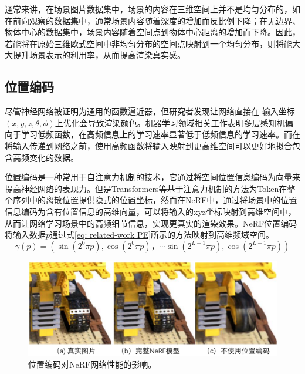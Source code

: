 通常来讲，在场景图片数据集中，场景的内容在三维空间上并不是均匀分布的，如在前向观察的数据集中，通常场景内容随着深度的增加而反比例下降；在无边界、物体中心的数据集中，场景内容随着空间点到物体中心距离的增加而下降。因此，若能将在原始三维欧式空间中非均匀分布的空间点映射到一个均匀分布，则将能大大提升场景表示的利用率，从而提高渲染真实感。

\subsection{位置编码}
\label{sec: related-work positional encoding}

尽管神经网络被证明为通用的函数逼近器\cite{hornik_multilayer_1989}，但研究者发现让网络直接在 输入坐标$(x,y,z,\theta,\phi)$上优化会导致渲染颜色。机器学习领域相关工作\cite{rahaman_spectral_2019}表明多层感知机偏向于学习低频函数，在高频信息上的学习速率显著低于低频信息的学习速率。而在将输入传递到网络之前，使用高频函数将输入映射到更高维空间可以更好地拟合包含高频变化的数据。

位置编码是一种常用于自注意力机制的技术，它通过将空间位置信息编码为向量来提高神经网络的表现力。但是Transformers\cite{vaswani_attention_2017}等基于注意力机制的方法为Token在整个序列中的离散位置提供隐式的位置坐标，然而在NeRF\cite{mildenhall_nerf_2020}中，通过将场景中的位置信息编码为含有位置信息的高维向量，可以将输入的xyz坐标映射到高维空间中，从而让网络学习场景中的高频细节信息，实现更真实的渲染效果。NeRF位置编码将输入数据$p$通过式\ref{eq: related-work PE}所示的方法映射到高维频域空间。
\begin{equation}
    \gamma(p) = \left(\sin(2^0\pi p),\cos(2^0\pi p)，\cdots \sin(2^{L-1}\pi p),\cos(2^{L-1}\pi p)\right)
    \label{eq: related-work PE}
\end{equation}

\begin{figure}[ht]
    \centering
    \includegraphics[width=\textwidth]{undergraduate-thesis/images/related-work/NeRF ablation-PE.pdf}
    \caption{位置编码对NeRF网络性能的影响\cite{mildenhall_nerf_2020}。}
    \label{fig:related-work nerf-PE-ablation}
\end{figure}

